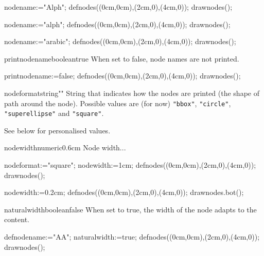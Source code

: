 \documentclass[11pt,a4paper,english]{article}
\begin{document}
\begin{exemple}[lefthand ratio = 0.6]
nodename:="Alph";
defnodes((0cm,0cm),(2cm,0),(4cm,0));
drawnodes();
\end{exemple}

\begin{exemple}[lefthand ratio = 0.6]
nodename:="alph";
defnodes((0cm,0cm),(2cm,0),(4cm,0));
drawnodes();
\end{exemple}

\begin{exemple}[lefthand ratio = 0.6]
nodename:="arabic";
defnodes((0cm,0cm),(2cm,0),(4cm,0));
drawnodes();
\end{exemple}

\begin{mptparam}{printnodename}{boolean}{true}
When set to false, node names are not printed.
\end{mptparam}

\begin{exemple}[lefthand ratio = 0.6]
printnodename:=false;
defnodes((0cm,0cm),(2cm,0),(4cm,0));
drawnodes();
\end{exemple}


\begin{mptparam}{nodeformat}{string}{""}
String that indicates how the nodes are printed (the shape of path around the node). Possible values are (for now) \verb|"bbox"|, \verb|"circle"|, \verb|"superellipse"| and \verb|"square"|.

See below for personalised values.
\end{mptparam}


\begin{mptparam}{nodewidth}{numeric}{0.6cm}
Node width...
\end{mptparam}

\begin{exemple}[lefthand ratio = 0.6]
nodeformat:="square";
nodewidth:=1cm;
defnodes((0cm,0cm),(2cm,0),(4cm,0));
drawnodes();
\end{exemple}

\begin{exemple}[lefthand ratio = 0.6]
nodewidth:=0.2cm;
defnodes((0cm,0cm),(2cm,0),(4cm,0));
drawnodes.bot();
\end{exemple}

\begin{mptparam}{naturalwidth}{boolean}{false}
When set to true, the width of the node adapts to the content.
\end{mptparam}

\begin{exemple}[lefthand ratio = 0.6]
defnodename:="AA";
naturalwidth:=true;
defnodes((0cm,0cm),(2cm,0),(4cm,0));
drawnodes();
\end{exemple}
\end{document}
